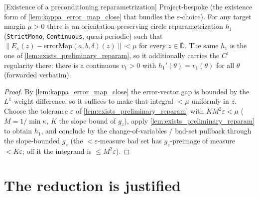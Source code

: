 \begin{lemma}

[Existence of a preconditioning reparametrization]
  \label{lem:exists_reparam_close}
  Project-bespoke (the existence form of \cref{lem:kappa_error_map_close} that
  bundles the $\varepsilon$-choice). For any target margin $\mu>0$ there is an
  orientation-preserving circle reparametrization $h_1$ (\texttt{StrictMono},
  \texttt{Continuous}, quasi-periodic) such that
  $\lVert E_\kappa(z)-\mathrm{errorMap}(a,b,\delta)(z)\rVert<\mu$ for every
  $z\in\overline{\mathbb D}$. The same $h_1$ is the one of
  \cref{lem:exists_preliminary_reparam}, so it additionally carries the $C^1$
  regularity there: there is a continuous $v_1>0$ with $h_1'(\theta)=v_1(\theta)$
  for all $\theta$ (forwarded verbatim).
\end{lemma}
\begin{proof}
  By \cref{lem:kappa_error_map_close} the error-vector gap is bounded by the
  $L^1$ weight difference, so it suffices to make that integral $<\mu$ uniformly
  in $z$. Choose the tolerance $\varepsilon$ of \cref{lem:exists_preliminary_reparam}
  with $K M^2\varepsilon<\mu$ ($M=1/\min\kappa$, $K$ the slope bound of $g_z$),
  apply \cref{lem:exists_preliminary_reparam} to obtain $h_1$, and conclude by the
  change-of-variables / bad-set pullback through the slope-bounded $g_z$ (the
  $<\varepsilon$-measure bad set has $g_z$-preimage of measure $<K\varepsilon$; off
  it the integrand is $\le M^2\varepsilon$).
\end{proof}

\section{The reduction is justified}

